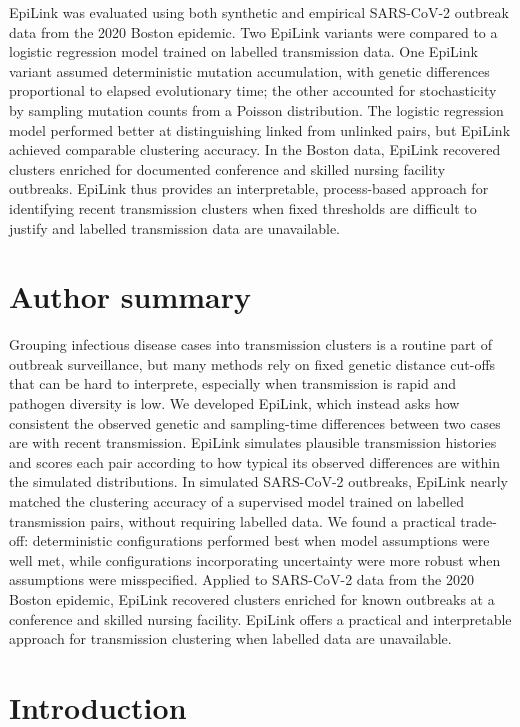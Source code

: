 \documentclass[10pt,letterpaper]{article}
\begin{document}
EpiLink was evaluated using both synthetic and empirical SARS-CoV-2 outbreak data from the 2020 Boston epidemic. Two EpiLink variants were compared to a logistic regression model trained on labelled transmission data. One EpiLink variant assumed deterministic mutation accumulation, with genetic differences proportional to elapsed evolutionary time; the other accounted for stochasticity by sampling mutation counts from a Poisson distribution. The logistic regression model performed better at distinguishing linked from unlinked pairs, but EpiLink achieved comparable clustering accuracy. In the Boston data, EpiLink recovered clusters enriched for documented conference and skilled nursing facility outbreaks. EpiLink thus provides an interpretable, process-based approach for identifying recent transmission clusters when fixed thresholds are difficult to justify and labelled transmission data are unavailable.

\section*{Author summary}
Grouping infectious disease cases into transmission clusters is a routine part of outbreak surveillance, but many methods rely on fixed genetic distance cut-offs that can be hard to interprete, especially when transmission is rapid and pathogen diversity is low. We developed EpiLink, which instead asks how consistent the observed genetic and sampling-time differences between two cases are with recent transmission. EpiLink simulates plausible transmission histories and scores each pair according to how typical its observed differences are within the simulated distributions. In simulated SARS-CoV-2 outbreaks, EpiLink nearly matched the clustering accuracy of a supervised model trained on labelled transmission pairs, without requiring labelled data. We found a practical trade-off: deterministic configurations performed best when model assumptions were well met, while configurations incorporating uncertainty were more robust when assumptions were misspecified. Applied to SARS-CoV-2 data from the 2020 Boston epidemic, EpiLink recovered clusters enriched for known outbreaks at a conference and skilled nursing facility. EpiLink offers a practical and interpretable approach for transmission clustering when labelled data are unavailable.

\linenumbers%

\section*{Introduction}
\end{document}
